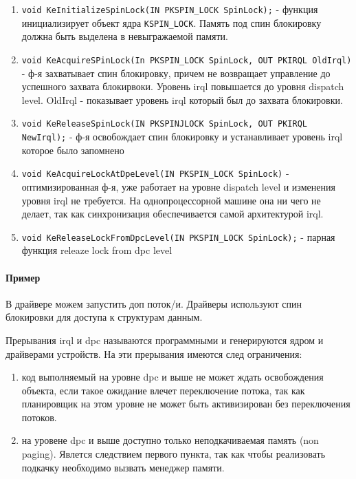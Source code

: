 \begin{enumerate}
	\item \verb|void KeInitializeSpinLock(IN PKSPIN_LOCK SpinLock);| - функция инициализирует объект ядра \verb|KSPIN_LOCK|. Память под спин блокировку должна быть выделена в невыгражаемой памяти.
	\item \verb|void KeAcquireSPinLock(In PKSPIN_LOCK SpinLock, OUT PKIRQL OldIrql)| - ф-я захватывает спин блокировку, причем не возвращает управление до успешного захвата блокирвоки. Уровень irql  повышается до уровня dispatch level. OldIrql - показывает уровень irql который был до захвата блокировки.
	\item \verb|void KeReleaseSpinLock(IN PKSPINJLOCK SpinLock, OUT PKIRQL NewIrql);| - ф-я освобождает спин блокировку и устанавливает уровень irql которое было запомнено
	\item \verb|void KeAcquireLockAtDpeLevel(IN PKSPIN_LOCK SpinLock)| - оптимизированная ф-я, уже работает на уровне dispatch level и изменения уровня irql не требуется. На однопроцессорной машине она ни чего не делает, так как синхронизация обеспечивается самой архитектурой irql.
	\item \verb|void KeReleaseLockFromDpcLevel(IN PKSPIN_LOCK SpinLock);| - парная функция releaze lock from dpc level
\end{enumerate}	

\paragraph{Пример}

В драйвере можем запустить доп поток/и. Драйверы используют спин блокировки для доступа к структурам данным.

 

Прерывания irql и dpc называются программными и генерируются ядром и драйверами устройств. На эти прерывания имеются след ограничения:
\begin{enumerate}
	\item код выполняемый на уровне dpc и выше не может ждать освобождения объекта, если такое ожидание влечет переключение потока, так как планировщик на этом уровне не может быть активизирован без переключения потоков.
	\item на уровене dpc и выше доступно  только неподкачиваемая память (non paging). Явлется следствием первого пункта, так как чтобы реализовать подкачку необходимо вызвать менеджер памяти.
\end{enumerate}

